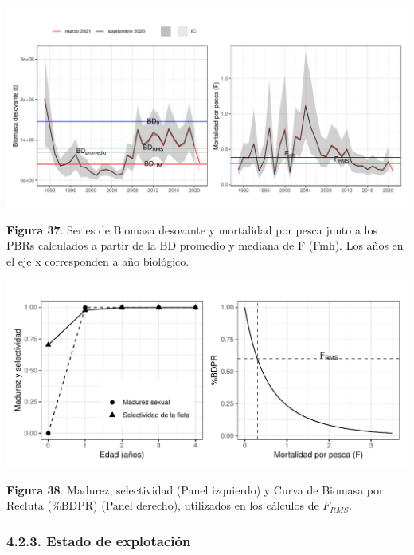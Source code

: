\documentclass[
  spanish,
]{article}
\begin{document}
\begin{center}\includegraphics{FigurasInforme_Marzo/F37_PBRs_Bmed_Fmed-1} \end{center}

\vspace{-0.5cm}
\small

\textbf{Figura 37}. Series de Biomasa desovante y mortalidad por pesca
junto a los PBRs calculados a partir de la BD promedio y mediana de F
(Fmh). Los años en el eje x corresponden a año biológico. \normalsize

\begin{center}\includegraphics{FigurasInforme_Marzo/F38_madurezyselectividad-1} \end{center}

\small

\textbf{Figura 38}. Madurez, selectividad (Panel izquierdo) y Curva de
Biomasa por Recluta (\%BDPR) (Panel derecho), utilizados en los cálculos
de \(F_{RMS}\). \vspace{0.5cm} \normalsize

\hypertarget{estado-de-explotaciuxf3n}{%
\subsubsection{4.2.3. Estado de
explotación}\label{estado-de-explotaciuxf3n}}
\end{document}
